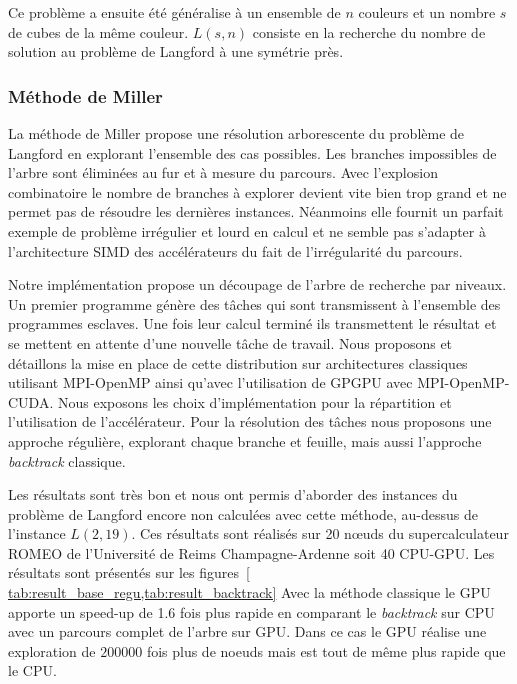 \documentclass[12pt,a4paper]{report}
\begin{document}
Ce problème a ensuite été généralise à un ensemble de $n$ couleurs et un nombre $s$ de cubes de la même couleur.   
$L(s,n)$ consiste en la recherche du nombre de solution au problème de Langford à une symétrie près. 

\subsubsection{Méthode de Miller}
La méthode de Miller propose une résolution arborescente du problème de Langford en explorant l'ensemble des cas possibles.
Les branches impossibles de l'arbre sont éliminées au fur et à mesure du parcours.
Avec l'explosion combinatoire le nombre de branches à explorer devient vite bien trop grand et ne permet pas de résoudre les dernières instances. 
Néanmoins elle fournit un parfait exemple de problème irrégulier et lourd en calcul et ne semble pas s'adapter à l'architecture SIMD des accélérateurs du fait de l'irrégularité du parcours. 

Notre implémentation propose un découpage de l'arbre de recherche par niveaux. 
Un premier programme génère des tâches qui sont transmissent à l'ensemble des programmes esclaves. 
Une fois leur calcul terminé ils transmettent le résultat et se mettent en attente d'une nouvelle tâche de travail.
Nous proposons et détaillons la mise en place de cette distribution sur architectures classiques utilisant MPI-OpenMP ainsi qu'avec l'utilisation de GPGPU avec MPI-OpenMP-CUDA.
Nous exposons les choix d'implémentation pour la répartition et l'utilisation de l'accélérateur. 
Pour la résolution des tâches nous proposons une approche régulière, explorant chaque branche et feuille, mais aussi l'approche \textit{backtrack} classique. 

Les résultats sont très bon et nous ont permis d'aborder des instances du problème de Langford encore non calculées avec cette méthode, au-dessus de l'instance $L(2,19)$.
Ces résultats sont réalisés sur 20 nœuds du supercalculateur ROMEO de l'Université de Reims Champagne-Ardenne soit 40 CPU-GPU.
Les résultats sont présentés sur les figures~\ref{ tab:result_base_regu,tab:result_backtrack}
Avec la méthode classique le GPU apporte un speed-up de 1.6 fois plus rapide en comparant le \textit{backtrack} sur CPU avec un parcours complet de l'arbre sur GPU. 
Dans ce cas le GPU réalise une exploration de $200 000$ fois plus de noeuds mais est tout de même plus rapide que le CPU. 
\end{document}
